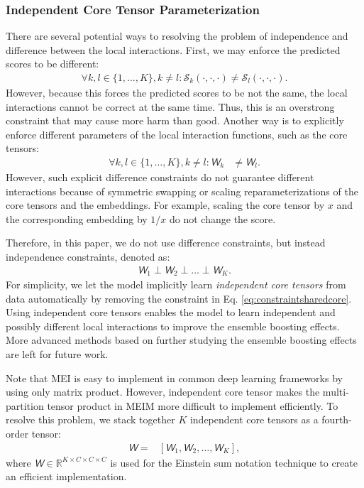 \documentclass{article}
\newcommand{\tens}[1]{\bm{\mathsfit{#1}}}
\def\tW{{\tens{W}}}
\def\gS{{\mathcal{S}}}
\def\sR{{\mathbb{R}}}
\theoremstyle{plain}
\theoremstyle{remark}
\begin{document}
\subsubsection{Independent Core Tensor Parameterization}
There are several potential ways to resolving the problem of independence and difference between the local interactions. First, we may enforce the predicted scores to be different:
\begin{align}
\forall k, l \in \{1, \dots, K\}, k \neq l: \gS_k (\cdot, \cdot, \cdot) \neq \gS_l (\cdot, \cdot, \cdot). \label{eq:constraintnonsharedscore}
\end{align}
However, because this forces the predicted scores to be not the same, the local interactions cannot be correct at the same time. Thus, this is an overstrong constraint that may cause more harm than good. Another way is to explicitly enforce different parameters of the local interaction functions, such as the core tensors:
\begin{align}
\forall k, l \in \{1, \dots, K\}, k \neq l: \tW_{k} &\neq \tW_{l}. \label{eq:constraintnonsharedcore}
\end{align}
However, such explicit difference constraints do not guarantee different interactions because of symmetric swapping or scaling reparameterizations of the core tensors and the embeddings. For example, scaling the core tensor by $ x $ and the corresponding embedding by $ 1/x $ do not change the score. 

Therefore, in this paper, we do not use difference constraints, but instead independence constraints, denoted as:
\begin{align}
	\tW_{1} \perp \tW_{2} \perp \dots \perp \tW_{K}. \label{eq:constraintindependentcore}
\end{align}
For simplicity, we let the model implicitly learn \textit{independent core tensors} from data automatically by removing the constraint in Eq. \ref{eq:constraintsharedcore}. Using independent core tensors enables the model to learn independent and possibly different local interactions to improve the ensemble boosting effects. More advanced methods based on further studying the ensemble boosting effects are left for future work. 

Note that MEI is easy to implement in common deep learning frameworks by using only matrix product. However, independent core tensor makes the multi-partition tensor product in MEIM more difficult to implement efficiently. To resolve this problem, we stack together $ K $ independent core tensors as a fourth-order tensor:
\begin{align}
\tW = &\left[\tW_{1}, \tW_{2}, \dots, \tW_K\right], \label{eq:nonsharedcore}
\end{align}
where $ \tW \in \sR^{K \times C \times C \times C} $ is used for the Einstein sum notation technique to create an efficient implementation. 
\end{document}
